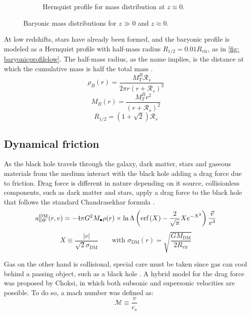 \begin{figure}[h]
\begin{subfigure}[b]{0.49\textwidth}
					\caption{Hernquist profile for mass distribution at $z \approx 0$.}
						\label{fig: baryonicprofilelow}
				\end{subfigure}
				\caption{Baryonic mass distributions for $z \gg 0$ and $z \approx 0$.}
				\label{fig: baryonicprofile}
			\end{figure}

		At low redshifts, stars have already been formed, and the baryonic profile is modeled as a Hernquist profile with half-mass radius $R_{1/2} = 0.01 R_\text{vir}$, as in \autoref{fig: baryonicprofilelow}. The half-mass radius, as the name implies, is the distance at which the cumulative mass is half the total mass \cite{hernquist1990analytical}.
		\begin{equation}
			\rho_B(r) = \dfrac{M_T^B \mathcal{R}_s}{2\pi r(r + \mathcal{R}_s)^3}
		\end{equation}
		\begin{equation}
			M_B(r) = \dfrac{M_T^B r^2}{(r + \mathcal{R}_s)^2}
		\end{equation}
		\begin{equation}
			R_{1/2} = \left(1 + \sqrt{2}\right)\mathcal{R}_s
		\end{equation}
		
	\subsection{Dynamical friction}
		As the black hole travels through the galaxy, dark matter, stars and gaseous materials from the medium interact with the black hole adding a drag force due to friction. Drag force is different in nature depending on it source, collisionless components, such as dark matter and stars, apply a drag force to the black hole that follows the standard Chandrasekhar formula \cite{choksi2017recoiling}.
		\begin{equation}
			a_\text{DF}^\text{DM}(r, v) = -4\pi G^2 M_\bullet\rho(r) \times \ln \Lambda\left(\text{erf}\left(X\right) - \dfrac{2}{\sqrt{\pi}}Xe^{-X^2}\right)\dfrac{\vec{v}}{v^3}
		\end{equation}
		\begin{equation}
			X \equiv \dfrac{|v|}{\sqrt{2}\sigma_\text{DM}} \qquad \text{with } \sigma_\text{DM}(r) = \sqrt{\dfrac{GM_\text{DM}}{2R_\text{vir}}}
		\end{equation}
		
		 Gas on the other hand is collisional, special care must be taken since gas can cool behind a passing object, such as a black hole \cite{choksi2017recoiling}. A hybrid model for the drag force was proposed by Choksi, in which both subsonic and supersonic velocities are possible. To do so, a mach number was defined as:
		 \begin{equation}
			 \mathcal{M} \equiv \dfrac{v}{c_s}
		 \end{equation}
		 
